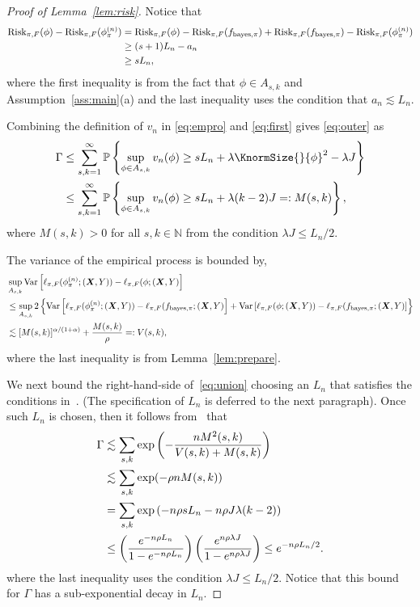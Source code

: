 \documentclass[11pt]{article}
\theoremstyle{plain}
\theoremstyle{definition}
\def\bayespif{f_{\textup{bayes},\pi}}
\def\riskF{\textup{Risk}_{\pi,F}}
\begin{document}
\begin{proof}[Proof of Lemma~\ref{lem:risk}]
Notice that 
\begin{align}\label{eq:first}
\riskF(\phi)-\riskF(\phi_\pi^{(n)}) &= \riskF(\phi)-\riskF(\bayespif)+\riskF(\bayespif)-\riskF(\phi_\pi^{(n)})\nonumber\\&\geq (s+1)L_n -a_n\nonumber
\\&\geq  sL_n,
\end{align}
where the first inequality is from the fact that $\phi\in A_{s,k}$ and Assumption~\ref{ass:main}(a) and the last inequality uses the condition that $a_n\lesssim L_n$.

Combining the definition of $v_n$ in \eqref{eq:empro} and \eqref{eq:first} gives \eqref{eq:outer} as
\begin{align}\label{eq:union}
\Gamma&\leq \sum_{s,k=1}^\infty\mathbb{P}\left\{\sup_{\phi\in A_{s,k}}  v_n(\phi)\geq sL_n + \lambda\KnormSize{}{\phi}^2-\lambda J\right\}\nonumber\\&\leq \sum_{s,k=1}^\infty\mathbb{P}\left\{\sup_{\phi\in A_{s,k}}  v_n(\phi)\geq sL_n + \lambda(k-2) J=: M(s,k)\right\},
\end{align}
where  $M(s,k)>0$ for all $s,k\in\mathbb{N}$ from the condition $\lambda J\leq L_n/2$.

The variance of the empirical process is bounded by,
\begin{align}\label{eq:second}
&\sup_{A_{s,k}}\textup{Var}\left[\ell_{\pi,F}(\phi_\pi^{(n)};(\mX,Y))-\ell_{\pi,F}(\phi;(\mX,Y)\right]\\&\leq\sup_{A_{s,k}}2\left\{ \textup{Var}\left[\ell_{\pi,F}(\phi_\pi^{(n)};(\mX,Y))-\ell_{\pi,F}(\bayespif;(\mX,Y)\right]+\textup{Var}\left[\ell_{\pi,F}(\phi;(\mX,Y))-\ell_{\pi,F}(\bayespif;(\mX,Y)\right]\right\}\notag \\
&\lesssim [M(s,k)]^{\alpha/(1+\alpha)}+{M(s,k)\over \rho}=:V(s,k),
\end{align}
where the last inequality is from Lemma~\ref{lem:prepare}.


We next bound the right-hand-side of~\eqref{eq:union} choosing an $L_n$ that satisfies the conditions in~\citet[Theorem 3]{shen1994convergence}. (The specification of $L_n$ is deferred to the next paragraph). Once such $L_n$ is chosen, then it follows from~\citet[Theorem 3]{shen1994convergence} that
\begin{align}\label{eq:gamma}
\Gamma& \lesssim \sum_{s,k}\exp\left( - {nM^2(s,k)\over V(s,k)+M(s,k)}\right)\notag \\
&\lesssim \sum_{s,k}\exp(-\rho nM(s,k)) \notag\\
&= \sum_{s,k}\exp\left(-n\rho sL_n-n\rho J \lambda(k-2)\right)\notag\\
&\leq \left({e^{-n\rho L_n}\over 1-e^{-n\rho L_n} }\right) \left({e^{n\rho \lambda J} \over 1-e^{n\rho \lambda J}}\right) \leq e^{-n \rho L_n/2}.
\end{align}
where the last inequality uses the condition $\lambda J\leq L_n/2$. Notice that this bound for $\Gamma$ has a sub-exponential decay in $L_n$. 


\end{proof}
\end{document}
